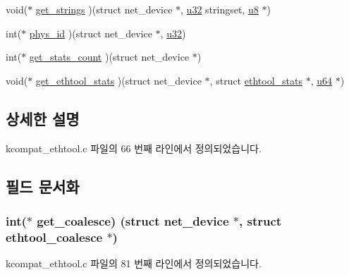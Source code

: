 \begin{DoxyCompactItemize}
void($\ast$ \hyperlink{struct__kc__ethtool__ops_adb2e458f3cfc03d869190e5a4c2ee10e}{get\+\_\+strings} )(struct net\+\_\+device $\ast$, \hyperlink{lib_2igb_2e1000__osdep_8h_a64e91c10a0d8fb627e92932050284264}{u32} stringset, \hyperlink{lib_2igb_2e1000__osdep_8h_a8baca7e76da9e0e11ce3a275dd19130c}{u8} $\ast$)
\item 
int($\ast$ \hyperlink{struct__kc__ethtool__ops_a833c39d85227b854c0eec6815d09138f}{phys\+\_\+id} )(struct net\+\_\+device $\ast$, \hyperlink{lib_2igb_2e1000__osdep_8h_a64e91c10a0d8fb627e92932050284264}{u32})
\item 
int($\ast$ \hyperlink{struct__kc__ethtool__ops_a9958b5607d069c0c0b7f4d2f4f5626fc}{get\+\_\+stats\+\_\+count} )(struct net\+\_\+device $\ast$)
\item 
void($\ast$ \hyperlink{struct__kc__ethtool__ops_a99f0ffd8f8f7b5def21d92213498fa0b}{get\+\_\+ethtool\+\_\+stats} )(struct net\+\_\+device $\ast$, struct \hyperlink{structethtool__stats}{ethtool\+\_\+stats} $\ast$, \hyperlink{lib_2igb_2e1000__osdep_8h_a1d8f78f95a414480659f3182e6067b80}{u64} $\ast$)
\end{DoxyCompactItemize}


\subsection{상세한 설명}


kcompat\+\_\+ethtool.\+c 파일의 66 번째 라인에서 정의되었습니다.



\subsection{필드 문서화}
\subsubsection[{\texorpdfstring{get\+\_\+coalesce}{get_coalesce}}]{\setlength{\rightskip}{0pt plus 5cm}int($\ast$ get\+\_\+coalesce) (struct net\+\_\+device $\ast$, struct {\bf ethtool\+\_\+coalesce} $\ast$)}\hypertarget{struct__kc__ethtool__ops_a01c981af71eef1a4dd123237bfee2db0}{}\label{struct__kc__ethtool__ops_a01c981af71eef1a4dd123237bfee2db0}


kcompat\+\_\+ethtool.\+c 파일의 81 번째 라인에서 정의되었습니다.

